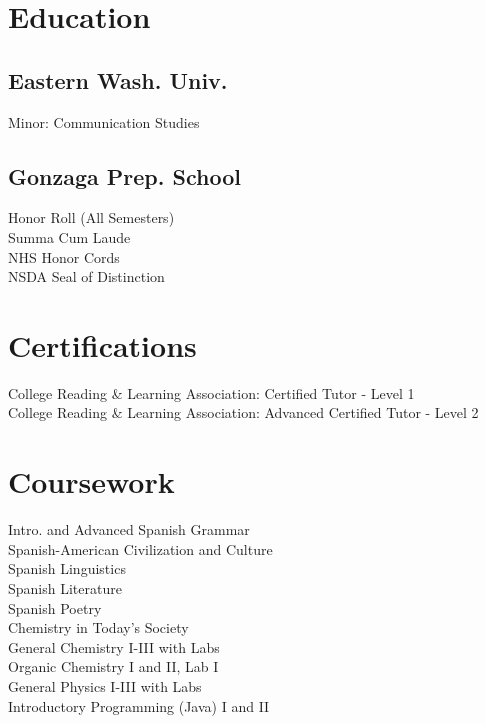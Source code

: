 \documentclass[]{deedy-resume-openfont}
\begin{document}
\begin{minipage}[t]{0.33\textwidth} 


\section{Education} 

\subsection{Eastern Wash. Univ.}
\textbullet Minor: Communication Studies
\sectionsep

\subsection{Gonzaga Prep. School}
\textbullet Honor Roll (All Semesters) \\
\textbullet Summa Cum Laude\\ 
\textbullet NHS Honor Cords\\
\textbullet NSDA Seal of Distinction
\sectionsep



\section{Certifications}
\textbullet College Reading \& Learning Association: Certified Tutor - Level 1\\
\textbullet College Reading \& Learning Association: Advanced Certified Tutor - Level 2\\
%

\section{Coursework}
\textbullet Intro. and Advanced Spanish Grammar \\
\textbullet Spanish-American Civilization and Culture \\
\textbullet Spanish Linguistics \\
\textbullet Spanish Literature \\
\textbullet Spanish Poetry\\
\textbullet Chemistry in Today's Society\\
\textbullet General Chemistry I-III with Labs \\
\textbullet Organic Chemistry I and II, Lab I \\
\textbullet General Physics I-III with Labs \\
\textbullet Introductory Programming (Java) I and II


\end{minipage}
\end{document}
